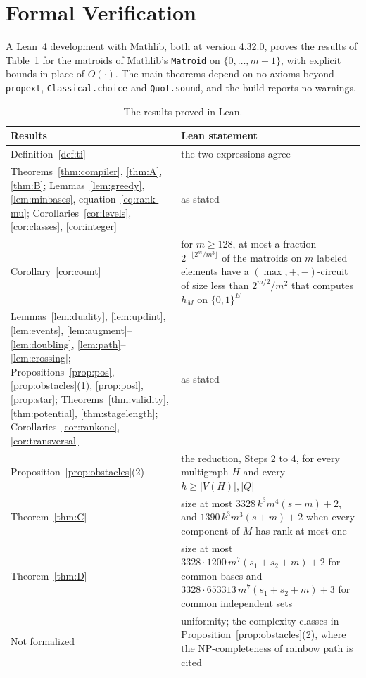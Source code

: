 \section{Formal Verification}
\label{app:checks}

A Lean~4 development with Mathlib, both at version 4.32.0, proves the results of
Table~\ref{tab:lean} for the matroids of Mathlib's \texttt{Matroid} on
$\{0,\ldots,m-1\}$, with explicit bounds in place of $O(\cdot)$.  The main theorems
depend on no axioms beyond \texttt{propext}, \texttt{Classical.choice} and
\texttt{Quot.sound}, and the build reports no warnings.

\begin{table}[ht]
\caption{The results proved in Lean.}
\label{tab:lean}
\centering
\renewcommand{\arraystretch}{1.25}
\begin{tabular}{@{}>{\raggedright\arraybackslash}p{}
                >{\raggedright\arraybackslash}p{}@{}}
\toprule
Results & Lean statement\\
\midrule
Definition~\ref{def:ti} & the two expressions agree\\
Theorems~\ref{thm:compiler}, \ref{thm:A}, \ref{thm:B}; Lemmas~\ref{lem:greedy},
\ref{lem:minbases}, equation~\eqref{eq:rank-mu}; Corollaries~\ref{cor:levels},
\ref{cor:classes}, \ref{cor:integer} & as stated\\
Corollary~\ref{cor:count} & for $m\ge128$, at most a fraction
$2^{-\lfloor2^{m}/m^{3}\rfloor}$ of the matroids on $m$ labeled elements have a
$(\max,+,-)$-circuit of size less than $2^{m/2}/m^{2}$ that computes $h_M$ on
$\{0,1\}^{E}$\\
Lemmas~\ref{lem:duality}, \ref{lem:updint}, \ref{lem:events},
\ref{lem:augment}--\ref{lem:doubling}, \ref{lem:path}--\ref{lem:crossing};
Propositions~\ref{prop:pos}, \ref{prop:obstacles}(1), \ref{prop:posl},
\ref{prop:star}; Theorems~\ref{thm:validity}, \ref{thm:potential},
\ref{thm:stagelength}; Corollaries~\ref{cor:rankone}, \ref{cor:transversal} & as
stated\\
Proposition~\ref{prop:obstacles}(2) & the reduction, Steps 2 to 4, for every
multigraph $H$ and every $h\ge|V(H)|,|Q|$\\
Theorem~\ref{thm:C} & size at most $3328\,k^{3}m^{4}(s+m)+2$, and
$1390\,k^{3}m^{3}(s+m)+2$ when every component of $M$ has rank at most one\\
Theorem~\ref{thm:D} & size at most $3328\cdot1200\,m^{7}(s_1+s_2+m)+2$ for common
bases and $3328\cdot653313\,m^{7}(s_1+s_2+m)+3$ for common independent sets\\
\midrule
Not formalized & uniformity; the complexity classes in
Proposition~\ref{prop:obstacles}(2), where the NP-completeness of rainbow path is
cited\\
\bottomrule
\end{tabular}
\end{table}
